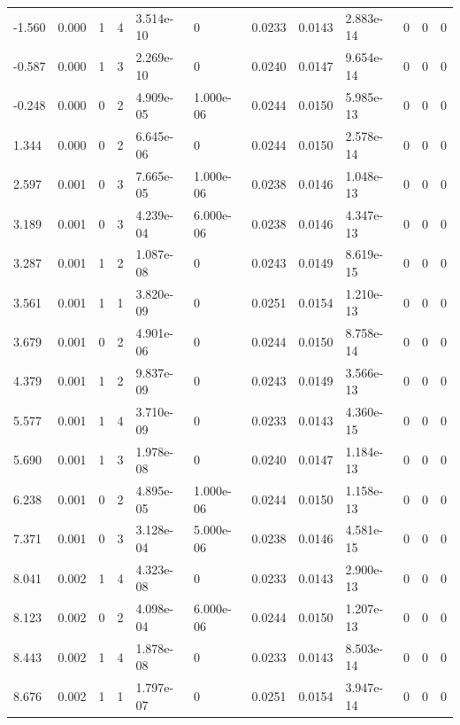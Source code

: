 \documentclass[preview]{standalone}
\begin{document}
{{\begin{tabular}{L{1.2cm}C{1.2cm} C{0.3cm}C{0.5cm} C{1.4cm}C{1.4cm} C{1.4cm}C{1.4cm} C{1.6cm}C{1.6cm} C{1.6cm}C{1.6cm}}
  -1.560  &  0.000  & 1     &  4 &  3.514e-10  & 0  &  0.0233&   0.0143& 2.883e-14 & 0   &  0 & 0  \\ 
  -0.587  &  0.000  & 1     &  3 &  2.269e-10  & 0  &  0.0240&   0.0147& 9.654e-14 & 0   &  0 & 0  \\ 
  -0.248  &  0.000  & 0     &  2 &  4.909e-05  & 1.000e-06  &  0.0244&   0.0150& 5.985e-13 & 0   &  0 & 0  \\ 
  1.344  &  0.000  & 0     &  2 &  6.645e-06  & 0  &  0.0244&   0.0150& 2.578e-14 & 0   &  0 & 0  \\ 
  2.597  &  0.001  & 0     &  3 &  7.665e-05  & 1.000e-06  &  0.0238&   0.0146& 1.048e-13 & 0   &  0 & 0  \\ 
  3.189  &  0.001  & 0     &  3 &  4.239e-04  & 6.000e-06  &  0.0238&   0.0146& 4.347e-13 & 0   &  0 & 0  \\ 
  3.287  &  0.001  & 1     &  2 &  1.087e-08  & 0  &  0.0243&   0.0149& 8.619e-15 & 0   &  0 & 0  \\ 
  3.561  &  0.001  & 1     &  1 &  3.820e-09  & 0  &  0.0251&   0.0154& 1.210e-13 & 0   &  0 & 0  \\ 
  3.679  &  0.001  & 0     &  2 &  4.901e-06  & 0  &  0.0244&   0.0150& 8.758e-14 & 0   &  0 & 0  \\ 
  4.379  &  0.001  & 1     &  2 &  9.837e-09  & 0  &  0.0243&   0.0149& 3.566e-13 & 0   &  0 & 0  \\ 
  5.577  &  0.001  & 1     &  4 &  3.710e-09  & 0  &  0.0233&   0.0143& 4.360e-15 & 0   &  0 & 0  \\ 
  5.690  &  0.001  & 1     &  3 &  1.978e-08  & 0  &  0.0240&   0.0147& 1.184e-13 & 0   &  0 & 0  \\ 
  6.238  &  0.001  & 0     &  2 &  4.895e-05  & 1.000e-06  &  0.0244&   0.0150& 1.158e-13 & 0   &  0 & 0  \\ 
  7.371  &  0.001  & 0     &  3 &  3.128e-04  & 5.000e-06  &  0.0238&   0.0146& 4.581e-15 & 0   &  0 & 0  \\ 
  8.041  &  0.002  & 1     &  4 &  4.323e-08  & 0  &  0.0233&   0.0143& 2.900e-13 & 0   &  0 & 0  \\ 
  8.123  &  0.002  & 0     &  2 &  4.098e-04  & 6.000e-06  &  0.0244&   0.0150& 1.207e-13 & 0   &  0 & 0  \\ 
  8.443  &  0.002  & 1     &  4 &  1.878e-08  & 0  &  0.0233&   0.0143& 8.503e-14 & 0   &  0 & 0  \\ 
  8.676  &  0.002  & 1     &  1 &  1.797e-07  & 0  &  0.0251&   0.0154& 3.947e-14 & 0   &  0 & 0  \\ 

\end{tabular}}}
\end{document}
